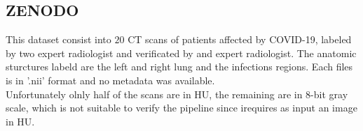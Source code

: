 \documentclass{standalone}
\begin{document}
	\subsection{ZENODO}
	This dataset consist into $20$ CT scans of patients affected by COVID-19, labeled by two expert radiologist and verificated by and expert radiologist. 
	The anatomic sturctures labeld are the left and right lung and the infections regions. 
	Each files is in '.nii' format and no metadata was available.\\
	
	Unfortunately olnly half of the scans are in HU, the remaining are in 8-bit gray scale, which is not suitable to verify the pipeline since irequires as input an image in HU.
\end{document}
